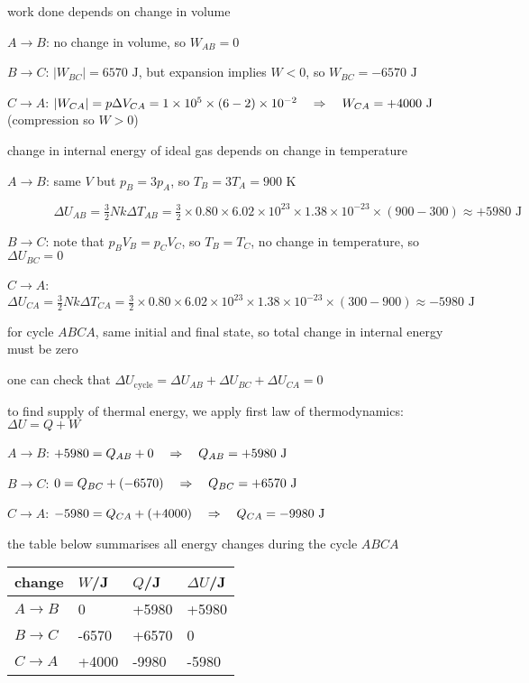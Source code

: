 \begin{soln} work done depends on change in volume

$A\to B$: no change in volume, so $W_{AB} = 0$

$B \to C$: $|W_{BC}|= 6570 \text{ J}$, but expansion implies $W<0$, so $W_{BC}=-6570 \text{ J}$

$C \to A$: $|W_{CA}| = p\Delta V_{CA} = 1\times10^5 \times (6-2)\times10^{-2} \quad \Rightarrow \quad W_{CA}= +4000 \text{ J}$ (compression so $W>0$)

\noindent change in internal energy of ideal gas depends on change in temperature

$A\to B$: same $V$ but $p_B = 3p_A$, so $T_B = 3T_A = 900 \text{ K}$

$\phantom{A\to B\text{: }}\Delta U_{AB} = \frac{3}{2}Nk\Delta T_{AB} = \frac{3}{2}\times 0.80\times 6.02\times10^{23}\times1.38\times10^{-23}\times(900-300) \approx +5980 \text{ J}$

$B \to C$: note that $p_BV_B = p_CV_C$, so $T_B = T_C$, no change in temperature, so $\Delta U_{BC}=0$

$C \to A$: $\Delta U_{CA} = \frac{3}{2}Nk\Delta T_{CA} = \frac{3}{2}\times 0.80\times 6.02\times10^{23}\times1.38\times10^{-23}\times(300-900) \approx -5980 \text{ J}$


for cycle $ABCA$, same initial and final state, so total change in internal energy must be zero

one can check that $\Delta U_\text{cycle} = \Delta U_{AB} + \Delta U_{BC} + \Delta U_{CA} = 0$
	
\noindent to find supply of thermal energy, we apply first law of thermodynamics: $\Delta U = Q + W$

$A\to B$: $+5980 = Q_{AB} + 0 \quad \Rightarrow \quad Q_{AB} = +5980 \text{ J}$

$B \to C$: $0 = Q_{BC} + (-6570) \quad \Rightarrow \quad Q_{BC} = +6570 \text{ J}$

$C \to A$: $-5980 = Q_{CA} + (+4000) \quad \Rightarrow \quad Q_{CA} = -9980 \text{ J}$

\noindent the table below summarises all energy changes during the cycle $ABCA$
\begin{center}
		\begin{tabular}{|C{2cm}|C{2cm}|C{2cm}|C{2cm}|}
			\hline
			change &  $W$/J & $Q$/J & $\Delta U$/J \\ \hline
			$A \to B$ & 0 & +5980 & +5980\\ \hline
			$B \to C$ & -6570 & +6570 & 0 \\ \hline
			$C \to A$ & +4000 & -9980 & -5980 \\ \hline
		\end{tabular}
	
	\vspace*{-0.1\baselineskip}
\end{center}
\end{soln}

